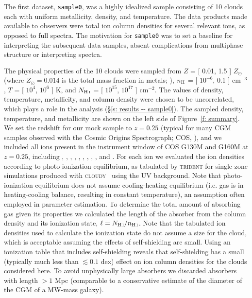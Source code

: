 \documentclass[fleqn,usenatbib]{mnras}
\begin{document}
The first dataset, \texttt{sample0}, was a highly idealized sample consisting of 10 clouds each with uniform metallicity, density, and temperature.
The data products made available to observers were total  ion column densities for several relevant ions, as opposed to full spectra.
The motivation for \texttt{sample0} was to set a baseline for interpreting the subsequent data samples, absent complications from multiphase structure or interpreting spectra.

The physical properties of the 10 clouds were sampled from $Z$ = [ 0.01, 1.5 ] $Z_\odot$ (where $Z_\odot = 0.014$ is the total mass fraction in metals; \citealt{asplund2009Chemical}), $n_{\rm H}$ = [ $10^{-6}$, 0.1 ] cm$^{-3}$, $T$ = [ $10^4$, $10^6$ ] K, and $N_{\ion{H}{I}}$ = [ $10^{15}$, $10^{17}$ ] cm$^{-2}$.
The values of density, temperature, metallicity, and  column density were chosen to be uncorrelated, which plays a role in the analysis (\S\ref{s: results -- sample0}).
The sampled density, temperature, and metallicity are shown on the left side of Figure~\ref{f: summary}.
We set the redshift for our mock sample to $z=0.25$ (typical for many CGM samples observed with the Cosmic Origins Spectrograph; COS, \citealt{green2012COSMIC}), and we included all ions present in the instrument window of COS G130M and G160M at $z=0.25$, including , , , , , , ,  , , and .
For each ion we evaluated the ion densities according to photo-ionization equilibrium, as tabulated by \textsc{trident} for single zone simulations produced with \textsc{cloudy}~\citep{ferland20132013} using the \cite{haardt2012RADIATIVE} UV background.
Note that photo-ionization equilibrium does not assume cooling-heating equilibrium (i.e. gas is in heating-cooling balance, resulting in constant temperature),
an assumption often employed in parameter estimation.
To determine the total amount of absorbing gas given its properties we calculated the length of the absorber from the  column density and its ionization state, $\ell = N_{\ion{H}{I}} / n_{\ion{H}{I}}$.
Note that the tabulated ion densities used to calculate the ionization state do not assume a size for the cloud, which is acceptable assuming the effects of self-shielding are small.
Using an ionization table that includes self-shielding reveals that self-shielding has a small (typically much less than $\lesssim 0.1$ dex) effect on ion column densities for the clouds considered here.
To avoid unphysically large absorbers we discarded absorbers with length $> 1$ Mpc (comparable to a conservative estimate of the diameter of the CGM of a MW-mass galaxy).
\end{document}
